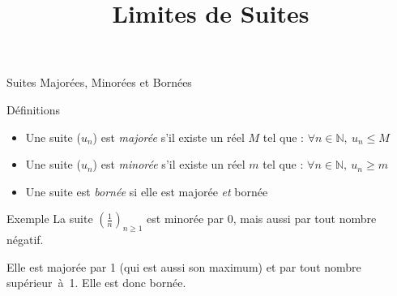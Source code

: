\documentclass{cours}
\title{Limites de Suites}
\begin{document}

    \begin{Gpartie}{Suites Majorées, Minorées et Bornées} 
        \begin{Spartie}{Définitions} 
            \begin{itemize}
                \item Une suite ($u_n$) est \emph{majorée} s'il existe un réel $M$ tel que : $\forall n\in\mathbb{N},~u_n\leq M$
                \item Une suite ($u_n$) est \emph{minorée} s'il existe un réel $m$ tel que : $\forall n\in\mathbb{N},~u_n\geq m$
                \item Une suite est \emph{bornée} si elle est majorée \emph{et} bornée
            \end{itemize}
        \end{Spartie}
        \begin{Spartie}{Exemple} 
            La suite $\left(\frac{1}{n}\right)_{n\geq 1}$ est minorée par 0, mais aussi par tout nombre négatif. 
            
            Elle est majorée par 1 (qui est aussi son maximum) et par tout nombre supérieur~à~1. Elle est donc bornée.
        \end{Spartie}
    \end{Gpartie}
\end{document}
